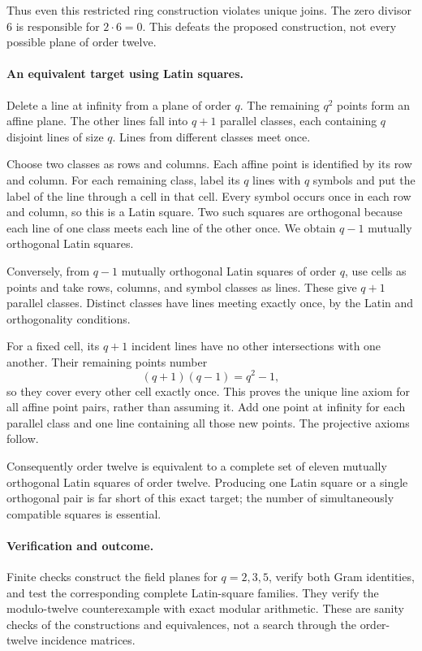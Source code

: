 \documentclass[11pt]{article}
\begin{document}
Thus even this restricted ring construction violates unique joins. The zero divisor $6$ is responsible for $2\cdot6=0$. This defeats the proposed construction, not every possible plane of order twelve.

\paragraph{An equivalent target using Latin squares.}
Delete a line at infinity from a plane of order $q$. The remaining $q^2$ points form an affine plane. The other lines fall into $q+1$ parallel classes, each containing $q$ disjoint lines of size $q$. Lines from different classes meet once.

Choose two classes as rows and columns. Each affine point is identified by its row and column. For each remaining class, label its $q$ lines with $q$ symbols and put the label of the line through a cell in that cell. Every symbol occurs once in each row and column, so this is a Latin square. Two such squares are orthogonal because each line of one class meets each line of the other once. We obtain $q-1$ mutually orthogonal Latin squares.

Conversely, from $q-1$ mutually orthogonal Latin squares of order $q$, use cells as points and take rows, columns, and symbol classes as lines. These give $q+1$ parallel classes. Distinct classes have lines meeting exactly once, by the Latin and orthogonality conditions.

For a fixed cell, its $q+1$ incident lines have no other intersections with one another. Their remaining points number
\[
 (q+1)(q-1)=q^2-1,
\]
so they cover every other cell exactly once. This proves the unique line axiom for all affine point pairs, rather than assuming it. Add one point at infinity for each parallel class and one line containing all those new points. The projective axioms follow.

Consequently order twelve is equivalent to a complete set of eleven mutually orthogonal Latin squares of order twelve. Producing one Latin square or a single orthogonal pair is far short of this exact target; the number of simultaneously compatible squares is essential.

\paragraph{Verification and outcome.}
Finite checks construct the field planes for $q=2,3,5$, verify both Gram identities, and test the corresponding complete Latin-square families. They verify the modulo-twelve counterexample with exact modular arithmetic. These are sanity checks of the constructions and equivalences, not a search through the order-twelve incidence matrices.
\end{document}
